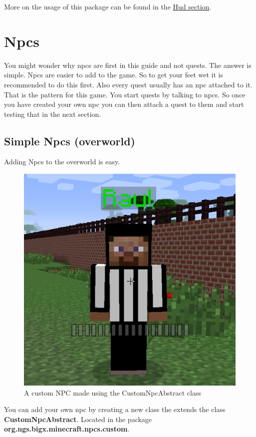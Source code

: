 \documentclass[12pt]{article}
\begin{document}
More on the usage of this package can be found in the \hyperref[sec:hud]{Hud section}.

\section{Npcs}
\label{sec:npcs}

You might wonder why npcs are first in this guide and not quests. The answer is simple. Npcs are easier to add to the game. So to get your feet wet it is recommended to do this first. Also every quest usually has an npc attached to it. That is the pattern for this game. You start quests by talking to npcs. So once you have created your own npc you can then attach a quest to them and start testing that in the next section.

\subsection{Simple Npcs (overworld)}

Adding Npcs to the overworld is easy.
\begin{figure}[h]
	\caption{A custom NPC made using the CustomNpcAbstract class}
	\includegraphics[scale=0.5]{images/npcs/Raul.png}
	\centering
\end{figure}

You can add your own npc by creating a new class the extends the class {\bfseries CustomNpcAbstract}. Located in the package {\bfseries org.ngs.bigx.minecraft.npcs.custom}.
\end{document}
